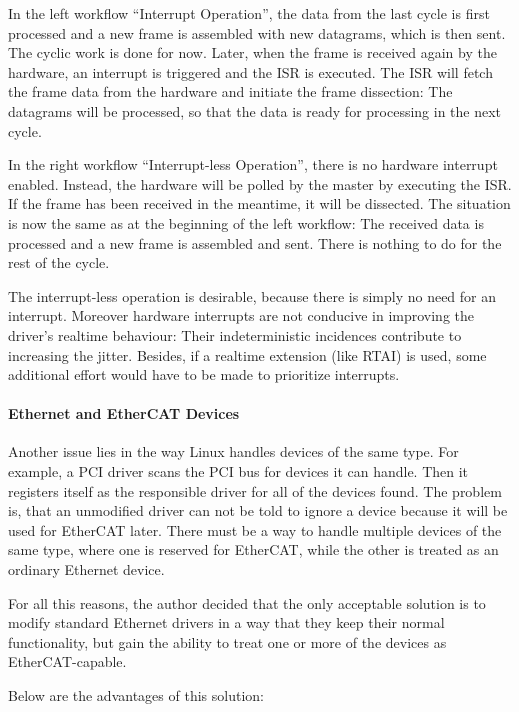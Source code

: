 \documentclass[a4paper,12pt,BCOR6mm,bibtotoc,idxtotoc]{scrbook}
\begin{document}
In the left workflow ``Interrupt Operation'', the data from the last cycle is
first processed and a new frame is assembled with new datagrams, which is then
sent.  The cyclic work is done for now.  Later, when the frame is received
again by the hardware, an interrupt is triggered and the ISR is executed. The
ISR will fetch the frame data from the hardware and initiate the frame
dissection: The datagrams will be processed, so that the data is ready for
processing in the next cycle.

In the right workflow ``Interrupt-less Operation'', there is no hardware
interrupt enabled.  Instead, the hardware will be polled by the master by
executing the ISR. If the frame has been received in the meantime, it will be
dissected. The situation is now the same as at the beginning of the left
workflow: The received data is processed and a new frame is assembled and
sent. There is nothing to do for the rest of the cycle.

The interrupt-less operation is desirable, because there is simply no need for
an interrupt. Moreover hardware interrupts are not conducive in improving the
driver's realtime behaviour: Their indeterministic incidences contribute to
increasing the jitter. Besides, if a realtime extension (like RTAI) is used,
some additional effort would have to be made to prioritize interrupts.

\paragraph{Ethernet and EtherCAT Devices}

Another issue lies in the way Linux handles devices of the same type.  For
example, a PCI driver scans the PCI bus for devices it can handle. Then it registers
itself as the responsible driver for all of the devices found. The problem is,
that an unmodified driver can not be told to ignore a device because it will
be used for EtherCAT later. There must be a way to handle multiple devices of
the same type, where one is reserved for EtherCAT, while the other is treated
as an ordinary Ethernet device.

For all this reasons, the author decided that the only acceptable solution is
to modify standard Ethernet drivers in a way that they keep their normal
functionality, but gain the ability to treat one or more of the devices as
EtherCAT-capable.

Below are the advantages of this solution:
\end{document}
